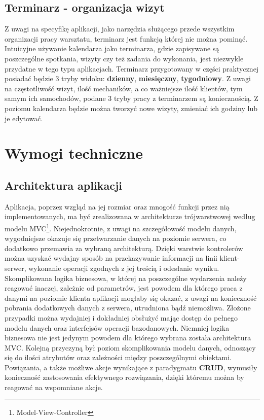 		\subsection{Terminarz - organizacja wizyt}
			Z uwagi na specyfikę aplikacji, jako narzędzia służącego przede wszystkim organizacji pracy warsztatu, terminarz jest funkcją której nie można pominąć. Intuicyjne używanie kalendarza jako terminarza, gdzie zapisywane są poszczególne spotkania, wizyty czy też zadania do wykonania, jest niezwykle przydatne w tego typu aplikacjach. Terminarz przygotowany w części praktycznej posiadać będzie 3 tryby widoku: \textbf{dzienny}, \textbf{miesięczny}, \textbf{tygodniowy}. Z uwagi na częstotliwość wizyt, ilość mechaników, a co ważniejsze ilość klientów, tym samym ich samochodów, podane 3 tryby pracy z terminarzem są koniecznością. Z poziomu kalendarza będzie można tworzyć nowe wizyty, zmieniać ich godziny lub je edytować. 

	\section{Wymogi techniczne}
	
		\subsection{Architektura aplikacji}
			Aplikacja, poprzez wzgląd na jej rozmiar oraz mnogość funkcji przez nią implementowanych, ma być zrealizowana w architekturze trójwarstwowej według modelu MVC\footnote{Model-View-Controller}. Niejednokrotnie, z uwagi na szczegółowość modelu danych, wygodniejsze okazuje się przetwarzanie danych na poziomie serwera, co dodatkowo przemawia za wybraną architekturą. Dzięki warstwie kontrolerów można uzyskać wydajny sposób na przekazywanie informacji na linii klient-serwer, wykonanie operacji zgodnych z jej treścią i odesłanie wyniku. Skomplikowana logika biznesowa, w której na poszczególne wydarzenia należy reagować inaczej, zależnie od parametrów, jest powodem dla którego praca z danymi na poziomie klienta aplikacji mogłaby się okazać, z uwagi na konieczność pobrania dodatkowych danych z serwera, utrudniona bądź niemożliwa. Złożone przypadki można wydajniej i dokładniej obsłużyć mając dostęp do pełnego modelu danych oraz interfejsów operacji bazodanowych. Niemniej logika biznesowa nie jest jedynym powodem dla którego wybrana została architektura MVC. Kolejną przyczyną był poziom skomplikowania modelu danych, odnoszący się do ilości atrybutów oraz zależności między poszczególnymi obiektami. Powiązania, a także możliwe akcje wynikające z paradygmatu \textbf{CRUD}, wymusiły konieczność zastosowania efektywnego rozwiązania, dzięki któremu można by reagować na wspomniane akcje. 
